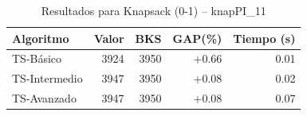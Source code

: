 \begin{table}[h]
\centering
\caption{Resultados para Knapsack (0-1) -- knapPI_11}
\label{tab:knapsack_knapPI_11}
\begin{tabular}{lrrrr}
\hline
\textbf{Algoritmo} & \textbf{Valor} & \textbf{BKS} & \textbf{GAP(\%)} & \textbf{Tiempo (s)} \\
\hline
TS-Básico & 3924 & 3950 & +0.66 & 0.01 \\
TS-Intermedio & 3947 & 3950 & +0.08 & 0.02 \\
TS-Avanzado & 3947 & 3950 & +0.08 & 0.07 \\
\hline
\end{tabular}
\end{table}
